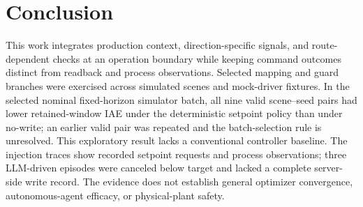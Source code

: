 \section{Conclusion}
\label{sec:conclusion}
This work integrates production context, direction-specific signals, and route-dependent checks at an operation boundary while keeping command outcomes distinct from readback and process observations. Selected mapping and guard branches were exercised across simulated scenes and mock-driver fixtures. In the selected nominal fixed-horizon simulator batch, all nine valid scene--seed pairs had lower retained-window IAE under the deterministic setpoint policy than under no-write; an earlier valid pair was repeated and the batch-selection rule is unresolved. This exploratory result lacks a conventional controller baseline. The injection traces show recorded setpoint requests and process observations; three LLM-driven episodes were canceled below target and lacked a complete server-side write record. The evidence does not establish general optimizer convergence, autonomous-agent efficacy, or physical-plant safety.
